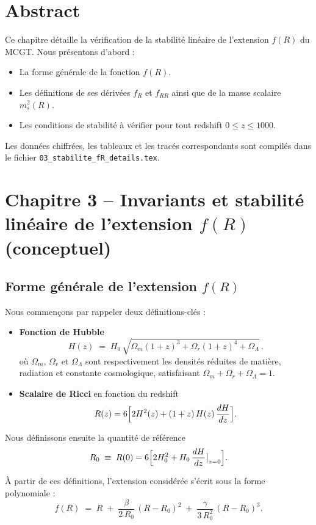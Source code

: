 \section*{Abstract}
Ce chapitre détaille la vérification de la stabilité linéaire de l’extension $f(R)$ du MCGT. Nous présentons d’abord :
\begin{itemize}
  \item La forme générale de la fonction $f(R)$.
  \item Les définitions de ses dérivées $f_{R}$ et $f_{RR}$ ainsi que de la masse scalaire $m_{s}^{2}(R)$.
  \item Les conditions de stabilité à vérifier pour tout redshift $0 \le z \le 1000$.
\end{itemize}
Les données chiffrées, les tableaux et les tracés correspondants sont compilés dans le fichier \texttt{03\_stabilite\_fR\_details.tex}.

\bigskip
\section{Chapitre 3 – Invariants et stabilité linéaire de l’extension $f(R)$ (conceptuel)}

\subsection{Forme générale de l’extension $f(R)$}

Nous commençons par rappeler deux définitions-clés :

\begin{itemize}
  \item \textbf{Fonction de Hubble}  
    \[
      H(z) \;=\; H_0\,\sqrt{\Omega_m(1+z)^3 + \Omega_r(1+z)^4 + \Omega_\Lambda}\,.
    \]
    où \(\Omega_m\), \(\Omega_r\) et \(\Omega_\Lambda\) sont respectivement les densités réduites de matière, radiation et constante cosmologique, satisfaisant \(\Omega_m+\Omega_r+\Omega_\Lambda=1\).
  \item \textbf{Scalaire de Ricci} en fonction du redshift  
    \[
      R(z)
      =6\Bigl[2H^2(z)+(1+z)\,H(z)\,\frac{dH}{dz}\Bigr].
    \]
\end{itemize}

Nous définissons ensuite la quantité de référence
\[
  R_0 \;\equiv\; R(0)
    =6\Bigl[2H_0^{2}
      + H_{0}\,\frac{dH}{dz}\bigl|_{z=0}\Bigr].
\]

À partir de ces définitions, l’extension considérée s’écrit sous la forme polynomiale :
\[
  f(R) \;=\; R 
    \;+\; \frac{\beta}{2\,R_{0}}\,(R - R_{0})^{2} 
    \;+\; \frac{\gamma}{3\,R_{0}^{2}}\,(R - R_{0})^{3}.
\]

